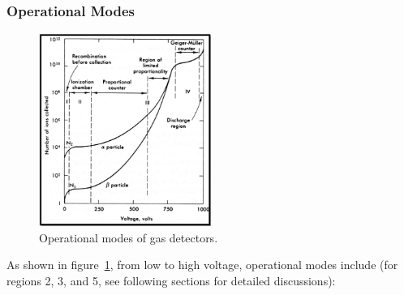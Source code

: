 \subsubsection{Operational Modes}
\begin{figure}[ht]
    \centering
    \includegraphics[width=0.5\textwidth]{images/gas_detector_operation_modes.png}
    \caption{Operational modes of gas detectors.}
    \label{fig:gas_detector_operation_modes}
\end{figure}
As shown in figure~\ref{fig:gas_detector_operation_modes}, from low to high voltage, operational modes include (for regions 2, 3, and 5, see following sections for detailed discussions):
